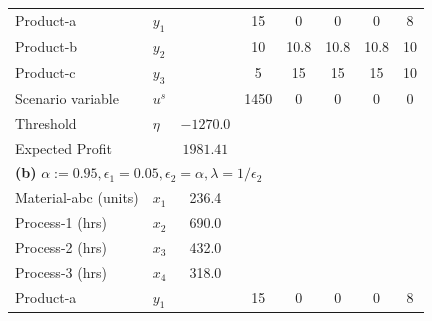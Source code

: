 \documentclass[7pt]{article}
\begin{document}
\begin{table}[h!]
\begin{tabular}{ll|c|ccccc}
        Product-a             & $y_1$                                      &                 & 15           & 0                 & 0             & 0                & 8             \\
        Product-b             & $y_2$                                      &                 & 10           & 10.8              & 10.8          & 10.8             & 10            \\
        Product-c             & $y_3$                                      &                 & 5            & 15                & 15            & 15               & 10            \\
        Scenario variable     & $u^s$                                      &                 & 1450         & 0                 & 0             & 0                & 0             \\
        Threshold             & $\eta$                                     & $-1270.0$       &                                                                                     \\
        Expected Profit       &                                            & $1981.41$       &                                                                                     \\
        \midrule
        \multicolumn{8}{l}{\textbf{(b)} $\alpha := 0.95, \epsilon_1 = 0.05, \epsilon_2 = \alpha, \lambda = 1/\epsilon_2 $}                                                         \\
        \midrule
        Material-abc (units)  & $x_1$                                      & 236.4           &              &                   &               &                  &               \\
        Process-1 (hrs)       & $x_2$                                      & 690.0           &              &                   &               &                  &               \\
        Process-2 (hrs)       & $x_3$                                      & 432.0           &              &                   &               &                  &               \\
        Process-3 (hrs)       & $x_4$                                      & 318.0           &              &                   &               &                  &               \\
        Product-a             & $y_1$                                      &                 & 15           & 0                 & 0             & 0                & 8             \\

\end{tabular}
\end{table}
\end{document}
